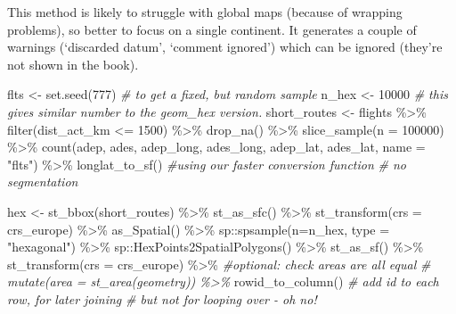\documentclass[
]{book}
\newenvironment{Shaded}{\begin{snugshade}}{\end{snugshade}}
\newcommand{\AttributeTok}[1]{\textcolor[rgb]{0.77,0.63,0.00}{#1}}
\newcommand{\CommentTok}[1]{\textcolor[rgb]{0.56,0.35,0.01}{\textit{#1}}}
\newcommand{\DecValTok}[1]{\textcolor[rgb]{0.00,0.00,0.81}{#1}}
\newcommand{\FunctionTok}[1]{\textcolor[rgb]{0.00,0.00,0.00}{#1}}
\newcommand{\NormalTok}[1]{#1}
\newcommand{\OtherTok}[1]{\textcolor[rgb]{0.56,0.35,0.01}{#1}}
\newcommand{\SpecialCharTok}[1]{\textcolor[rgb]{0.00,0.00,0.00}{#1}}
\newcommand{\StringTok}[1]{\textcolor[rgb]{0.31,0.60,0.02}{#1}}
\begin{document}
This method is likely to struggle with global maps (because of wrapping problems), so better to focus on a single continent. It generates a couple of warnings (`discarded datum', `comment ignored') which can be ignored (they're not shown in the book).

\begin{Shaded}
\begin{Highlighting}[]
\NormalTok{flts }\OtherTok{\textless{}{-}} \FunctionTok{set.seed}\NormalTok{(}\DecValTok{777}\NormalTok{) }\CommentTok{\# to get a fixed, but random sample}
\NormalTok{n\_hex }\OtherTok{\textless{}{-}} \DecValTok{10000} \CommentTok{\# this gives similar number to the \textquotesingle{}geom\_hex\textquotesingle{} version.}
\NormalTok{short\_routes }\OtherTok{\textless{}{-}}\NormalTok{ flights }\SpecialCharTok{\%\textgreater{}\%} 
  \FunctionTok{filter}\NormalTok{(dist\_act\_km }\SpecialCharTok{\textless{}=} \DecValTok{1500}\NormalTok{) }\SpecialCharTok{\%\textgreater{}\%} 
  \FunctionTok{drop\_na}\NormalTok{() }\SpecialCharTok{\%\textgreater{}\%} 
  \FunctionTok{slice\_sample}\NormalTok{(}\AttributeTok{n =} \DecValTok{100000}\NormalTok{) }\SpecialCharTok{\%\textgreater{}\%}
  \FunctionTok{count}\NormalTok{(adep, ades, adep\_long, ades\_long, adep\_lat, ades\_lat,}
        \AttributeTok{name =} \StringTok{"flts"}\NormalTok{) }\SpecialCharTok{\%\textgreater{}\%} 
  \FunctionTok{longlat\_to\_sf}\NormalTok{() }\CommentTok{\#using our faster conversion function}
  \CommentTok{\# no segmentation}
  
\NormalTok{hex }\OtherTok{\textless{}{-}} \FunctionTok{st\_bbox}\NormalTok{(short\_routes) }\SpecialCharTok{\%\textgreater{}\%} 
  \FunctionTok{st\_as\_sfc}\NormalTok{() }\SpecialCharTok{\%\textgreater{}\%} 
  \FunctionTok{st\_transform}\NormalTok{(}\AttributeTok{crs =}\NormalTok{ crs\_europe) }\SpecialCharTok{\%\textgreater{}\%} 
  \FunctionTok{as\_Spatial}\NormalTok{() }\SpecialCharTok{\%\textgreater{}\%} 
\NormalTok{  sp}\SpecialCharTok{::}\FunctionTok{spsample}\NormalTok{(}\AttributeTok{n=}\NormalTok{n\_hex, }\AttributeTok{type =} \StringTok{"hexagonal"}\NormalTok{) }\SpecialCharTok{\%\textgreater{}\%} 
\NormalTok{  sp}\SpecialCharTok{::}\FunctionTok{HexPoints2SpatialPolygons}\NormalTok{() }\SpecialCharTok{\%\textgreater{}\%} 
  \FunctionTok{st\_as\_sf}\NormalTok{() }\SpecialCharTok{\%\textgreater{}\%} 
  \FunctionTok{st\_transform}\NormalTok{(}\AttributeTok{crs =}\NormalTok{ crs\_europe) }\SpecialCharTok{\%\textgreater{}\%} 
  \CommentTok{\#optional: check areas are all equal}
  \CommentTok{\# mutate(area = st\_area(geometry)) \%\textgreater{}\% }
  \FunctionTok{rowid\_to\_column}\NormalTok{() }\CommentTok{\# add id to each row, for later joining}
  \CommentTok{\# but not for looping over {-} oh no!}


\end{Highlighting}
\end{Shaded}
\end{document}
